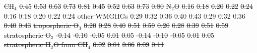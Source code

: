 \documentclass[gmd, manuscript]{copernicus}
\providecommand{\DIFdel}[1]{{\protect\color{red}\sout{#1}}}                      %
\providecommand{\DIFdelFL}[1]{\DIFdel{#1}} %
\begin{document}
\begin{table}[t]
\DIFdelFL{CH$_4$       }%
\DIFdelFL{0.45 }%
\DIFdelFL{0.53 }%
\DIFdelFL{0.63 }%
\DIFdelFL{0.73 }%
\DIFdelFL{0.81 }%
\DIFdelFL{0.45 }%
\DIFdelFL{0.52 }%
\DIFdelFL{0.63 }%
\DIFdelFL{0.73 }%
\DIFdelFL{0.80 }%
\DIFdelFL{N$_2$O  }%
\DIFdelFL{0.16 }%
\DIFdelFL{0.18 }%
\DIFdelFL{0.20 }%
\DIFdelFL{0.22 }%
\DIFdelFL{0.24 }%
\DIFdelFL{0.16 }%
\DIFdelFL{0.18 }%
\DIFdelFL{0.20 }%
\DIFdelFL{0.22 }%
\DIFdelFL{0.24 }%
\DIFdelFL{other WMGHGs   }%
\DIFdelFL{0.29 }%
\DIFdelFL{0.32 }%
\DIFdelFL{0.36 }%
\DIFdelFL{0.40 }%
\DIFdelFL{0.43 }%
\DIFdelFL{0.29 }%
\DIFdelFL{0.32 }%
\DIFdelFL{0.36 }%
\DIFdelFL{0.40 }%
\DIFdelFL{0.43 }%
\DIFdelFL{tropospheric O$_3$        }%
\DIFdelFL{0.20 }%
\DIFdelFL{0.28 }%
\DIFdelFL{0.40 }%
\DIFdelFL{0.51 }%
\DIFdelFL{0.59 }%
\DIFdelFL{0.20 }%
\DIFdelFL{0.28 }%
\DIFdelFL{0.39 }%
\DIFdelFL{0.51 }%
\DIFdelFL{0.59 }%
\DIFdelFL{stratospheric O$_3$       }%
\DIFdelFL{-0.14 }%
\DIFdelFL{-0.10 }%
\DIFdelFL{-0.05 }%
\DIFdelFL{0.01 }%
\DIFdelFL{0.05 }%
\DIFdelFL{-0.14 }%
\DIFdelFL{-0.10 }%
\DIFdelFL{-0.05 }%
\DIFdelFL{0.01 }%
\DIFdelFL{0.05 }%
\DIFdelFL{stratospheric H$_2$O from CH$_4$      }%
\DIFdelFL{0.02 }%
\DIFdelFL{0.04 }%
\DIFdelFL{0.06 }%
\DIFdelFL{0.09 }%
\DIFdelFL{0.11 }%

\end{table}
\end{document}
